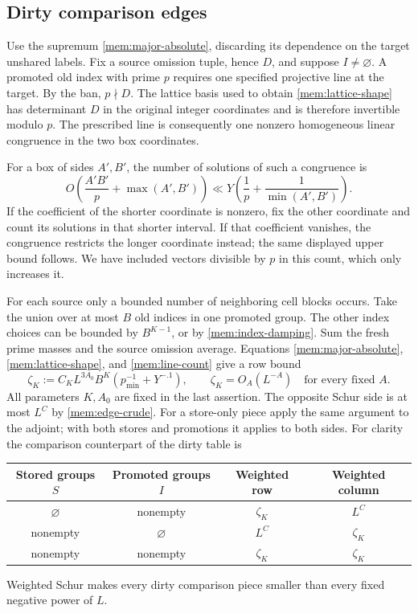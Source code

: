 \subsection{Dirty comparison edges}

Use the supremum \eqref{mem:major-absolute}, discarding its dependence
on the target unshared labels. Fix a source omission tuple, hence
$D$, and suppose $I\ne\varnothing$. A promoted old index with prime
$p$ requires one specified projective line at the target. By the ban,
$p\nmid D$. The lattice basis used to obtain
\eqref{mem:lattice-shape} has determinant $D$ in the original integer
coordinates and is therefore invertible modulo $p$. The prescribed
line is consequently one nonzero homogeneous linear congruence in
the two box coordinates.

For a box of sides $A',B'$, the number of solutions of such a
congruence is
\begin{equation}\label{mem:line-count}
 O\!\left(\frac{A'B'}p+\max(A',B')\right)
 \ll Y\left(\frac1p+\frac1{\min(A',B')}\right).
\end{equation}
If the coefficient of the shorter coordinate is nonzero, fix the
other coordinate and count its solutions in that shorter interval.
If that coefficient vanishes, the congruence restricts the longer
coordinate instead; the same displayed upper bound follows. We have
included vectors divisible by $p$ in this count, which only increases
it.

For each source only a bounded number of neighboring cell blocks
occurs. Take the union over at most $B$ old indices in one promoted
group. The other index choices can be bounded by $B^{K-1}$, or by
\eqref{mem:index-damping}. Sum the fresh prime masses and the source
omission average. Equations \eqref{mem:major-absolute},
\eqref{mem:lattice-shape}, and \eqref{mem:line-count} give a row bound
\begin{equation}\label{mem:comparison-small}
 \zeta_K
   :=C_K L^{3A_0}B^K\left(p_{\min}^{-1}+Y^{-.1}\right),
 \qquad \zeta_K=O_A(L^{-A})
 \quad\text{for every fixed }A.
\end{equation}
All parameters $K,A_0$ are fixed in the last assertion. The opposite
Schur side is at most $L^C$ by \eqref{mem:edge-crude}. For a store-only
piece apply the same argument to the adjoint; with both stores and
promotions it applies to both sides. For clarity the comparison
counterpart of the dirty table is
\begin{center}
\begin{tabular}{cccc}
\toprule
Stored groups $S$ & Promoted groups $I$ & Weighted row & Weighted column\\
\midrule
$\varnothing$ & nonempty & $\zeta_K$ & $L^C$\\
nonempty & $\varnothing$ & $L^C$ & $\zeta_K$\\
nonempty & nonempty & $\zeta_K$ & $\zeta_K$\\
\bottomrule
\end{tabular}
\end{center}
Weighted Schur makes every dirty comparison piece smaller than every
fixed negative power of $L$.

